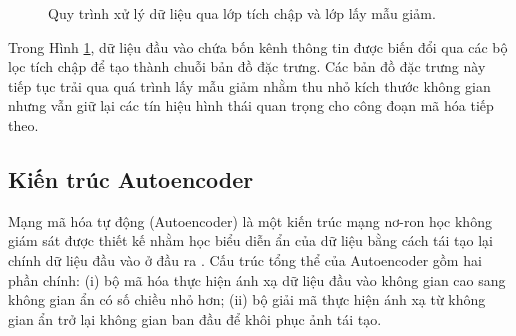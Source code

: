 \begin{figure}[h!]
\centering
{}
\caption{Quy trình xử lý dữ liệu qua lớp tích chập và lớp lấy mẫu giảm.}
\label{fig:cnn_pipeline}
\end{figure}

Trong Hình \ref{fig:cnn_pipeline}, dữ liệu đầu vào chứa bốn kênh thông tin được biến đổi qua các bộ lọc tích chập để tạo thành chuỗi bản đồ đặc trưng. Các bản đồ đặc trưng này tiếp tục trải qua quá trình lấy mẫu giảm nhằm thu nhỏ kích thước không gian nhưng vẫn giữ lại các tín hiệu hình thái quan trọng cho công đoạn mã hóa tiếp theo.

\subsection{Kiến trúc Autoencoder}

Mạng mã hóa tự động (Autoencoder) là một kiến trúc mạng nơ-ron học không giám sát được thiết kế nhằm học biểu diễn ẩn của dữ liệu bằng cách tái tạo lại chính dữ liệu đầu vào ở đầu ra \cite{goodfellow2016deep}. Cấu trúc tổng thể của Autoencoder gồm hai phần chính: (i) bộ mã hóa thực hiện ánh xạ dữ liệu đầu vào không gian cao sang không gian ẩn có số chiều nhỏ hơn; (ii) bộ giải mã thực hiện ánh xạ từ không gian ẩn trở lại không gian ban đầu để khôi phục ảnh tái tạo.


